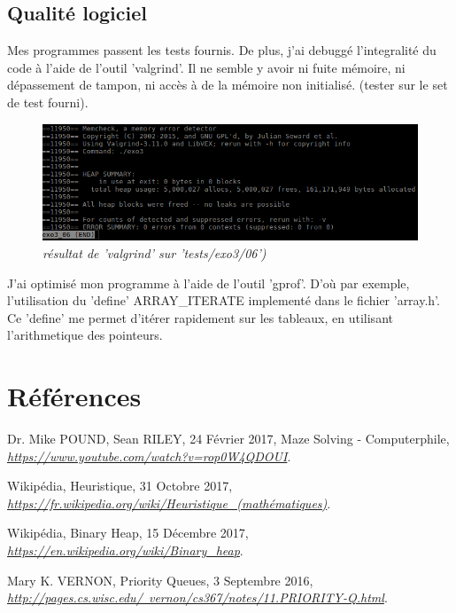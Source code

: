 \documentclass[10pt]{article}
\begin{document}
		\subsection{Qualité logiciel}
		Mes programmes passent les tests fournis.\newline    
		De plus, j'ai debuggé l'integralité du code à l'aide de l'outil 'valgrind'.
		Il ne semble y avoir ni fuite mémoire, ni dépassement de tampon, ni accès à de la mémoire non initialisé.
		(tester sur le set de test fourni).
		\begin{figure}
		\begin{center}
			\includegraphics[width=12cm,height=\textheight,keepaspectratio]{./images/valgrind.png}
		\end{center}
		\caption{\textit{résultat de 'valgrind' sur 'tests/exo3/06')}}
		\end{figure}
		J'ai optimisé mon programme à l'aide de l'outil 'gprof'.
		D'où par exemple, l'utilisation du 'define' ARRAY\_ITERATE implementé dans le fichier 'array.h'.
		Ce 'define' me permet d'itérer rapidement sur les tableaux, en utilisant l'arithmetique des pointeurs.\newline
	
	\section{Références}
		\begin{thebibliography}{}
				Dr. Mike POUND, Sean RILEY, 24 Février 2017,\newline
				Maze Solving - Computerphile,\newline
				\href{https://www.youtube.com/watch?v=rop0W4QDOUI}{\textit{https://www.youtube.com/watch?v=rop0W4QDOUI}}.
			  
				Wikipédia, Heuristique, 31 Octobre 2017,\newline
				\href{https://fr.wikipedia.org/wiki/Heuristique_(mathématiques)}
				      {\textit{https://fr.wikipedia.org/wiki/Heuristique\_(mathématiques)}}.
			  
				Wikipédia, Binary Heap, 15 Décembre 2017,\newline
				\href{https://en.wikipedia.org/wiki/Binary\_heap}
				      {\textit{https://en.wikipedia.org/wiki/Binary\_heap}}.

				Mary K. VERNON, Priority Queues, 3 Septembre 2016,\newline
				\href{http://pages.cs.wisc.edu/~vernon/cs367/notes/11.PRIORITY-Q.html}
					{\textit{http://pages.cs.wisc.edu/~vernon/cs367/notes/11.PRIORITY-Q.html}}.

  \end{thebibliography}
\end{document}
